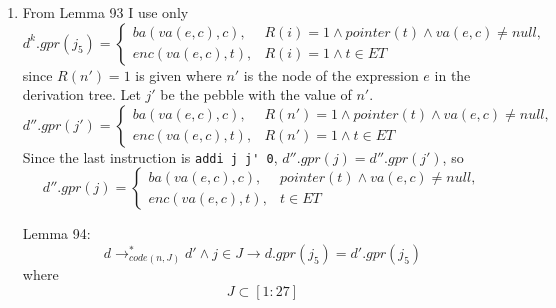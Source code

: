\documentclass{article}
\begin{document}
\begin{enumerate}
{\begin{displaymath}
\begin{aligned}
					\langle RegS\rangle \rightarrow\ & \langle Reg\rangle\ |\ \langle Reg\rangle\verb|,|\langle RegS\rangle & \text{we could use \texttt{;} instead of \texttt{,}} \\
					\langle St\rangle \rightarrow\ & \verb|gpr(|\langle Reg\rangle\verb|) = |\langle E\rangle \verb| {|\langle RegS\rangle\verb|}| \ | & \text{Adding new productions}\\
					& \langle id\rangle\verb| = gpr(|\langle Reg\rangle\verb|) {|\langle RegS\rangle\verb|}|
				\end{aligned}
			\end{displaymath}
		}
        \item {
			From Lemma 93 I use only
			\begin{displaymath}
				d^k.gpr(j_5) = 
				\begin{cases}
					ba(va(e,c),c), & R(i) = 1 \land pointer(t) \land va(e,c)\neq null, \\
					enc(va(e,c),t), & R(i) = 1 \land t \in ET
				\end{cases}
			\end{displaymath}
			since $R(n') = 1$ is given where $n'$ is the node of the expression $e$ in the derivation tree. Let $j'$ be the pebble with the value of $n'$.
			\begin{displaymath}
				d''.gpr(j') = 
				\begin{cases}
					ba(va(e,c),c), & R(n') = 1 \land pointer(t) \land va(e,c)\neq null, \\
					enc(va(e,c),t), & R(n') = 1 \land t \in ET
				\end{cases}
			\end{displaymath}
			Since the last instruction is {\verb|addi j j' 0|}, $d''.gpr(j) = d''.gpr(j')$, so
			\begin{displaymath}
				d''.gpr(j) = 
				\begin{cases}
					ba(va(e,c),c), & pointer(t) \land va(e,c)\neq null, \\
					enc(va(e,c),t), & t \in ET
				\end{cases}
			\end{displaymath}
			
			Lemma 94:
			\begin{displaymath}
				d \rightarrow^*_{code(n,J)} d' \land j \in J \rightarrow d.gpr(j_5) = d'.gpr(j_5)
			\end{displaymath}
			where
			\begin{displaymath}
				J \subset [1:27]
			\end{displaymath}

}
\end{enumerate}
\end{document}
